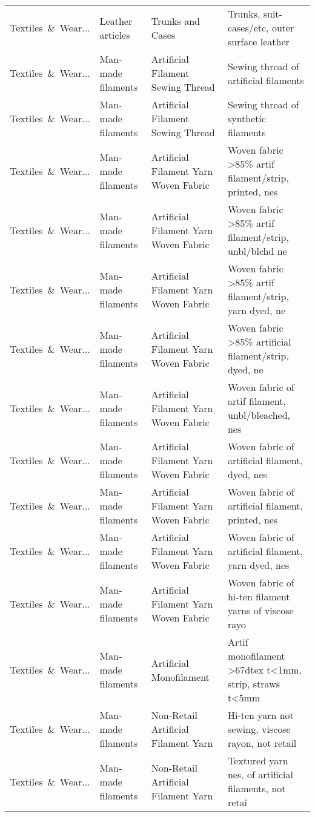 \begin{appendices}
\begin{xltabular}{\textwidth}{|p{0.10\textwidth}|p{0.25\textwidth}|p{0.24\textwidth}|p{0.31\textwidth}|}
Textiles\ \&\ Wear... & Leather articles & Trunks and Cases & Trunks, suit-cases/etc, outer surface leather \\
Textiles\ \&\ Wear... & Man-made filaments & Artificial Filament Sewing Thread & Sewing thread of artificial filaments \\
Textiles\ \&\ Wear... & Man-made filaments & Artificial Filament Sewing Thread & Sewing thread of synthetic filaments \\
Textiles\ \&\ Wear... & Man-made filaments & Artificial Filament Yarn Woven Fabric & Woven fabric >85\% artif filament/strip, printed, nes \\
Textiles\ \&\ Wear... & Man-made filaments & Artificial Filament Yarn Woven Fabric & Woven fabric >85\% artif filament/strip, unbl/blchd ne \\
Textiles\ \&\ Wear... & Man-made filaments & Artificial Filament Yarn Woven Fabric & Woven fabric >85\% artif filament/strip, yarn dyed, ne \\
Textiles\ \&\ Wear... & Man-made filaments & Artificial Filament Yarn Woven Fabric & Woven fabric >85\% artificial filament/strip, dyed, ne \\
Textiles\ \&\ Wear... & Man-made filaments & Artificial Filament Yarn Woven Fabric & Woven fabric of artif filament, unbl/bleached, nes \\
Textiles\ \&\ Wear... & Man-made filaments & Artificial Filament Yarn Woven Fabric & Woven fabric of artificial filament, dyed, nes \\
Textiles\ \&\ Wear... & Man-made filaments & Artificial Filament Yarn Woven Fabric & Woven fabric of artificial filament, printed, nes \\
Textiles\ \&\ Wear... & Man-made filaments & Artificial Filament Yarn Woven Fabric & Woven fabric of artificial filament, yarn dyed, nes \\
Textiles\ \&\ Wear... & Man-made filaments & Artificial Filament Yarn Woven Fabric & Woven fabric of hi-ten filament yarns of viscose rayo \\
Textiles\ \&\ Wear... & Man-made filaments & Artificial Monofilament & Artif monofilament >67dtex t<1mm, strip, straws t<5mm \\
Textiles\ \&\ Wear... & Man-made filaments & Non-Retail Artificial Filament Yarn & Hi-ten yarn not sewing, viscose rayon, not retail \\
Textiles\ \&\ Wear... & Man-made filaments & Non-Retail Artificial Filament Yarn & Textured yarn nes, of artificial filaments, not retai \\

\end{xltabular}
\end{appendices}

